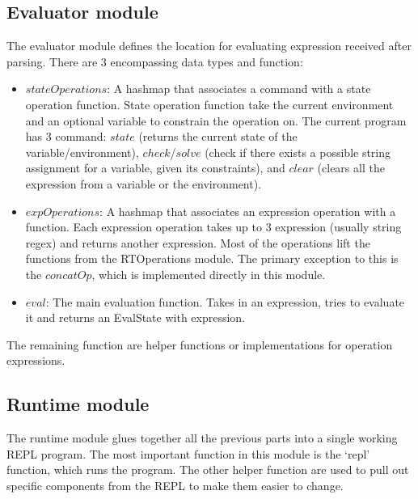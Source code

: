 \documentclass[letterpaper, 11pt]{article}
\begin{document}
\subsection{Evaluator module}\label{code:eval}
The evaluator module defines the location for evaluating expression received after parsing. There are 3 encompassing data types and function:
\begin{itemize}[itemsep=-0.3em]
    \item $stateOperations$: A hashmap that associates a command with a state operation function. State operation function take the current environment and an optional variable to constrain the operation on. The current program has 3 command: $state$ (returns the current state of the variable/environment), $check$/$solve$ (check if there exists a possible string assignment for a variable, given its constraints), and $clear$ (clears all the expression from a variable or the environment). 
    \item $expOperations$: A hashmap that associates an expression operation with a function. Each expression operation takes up to 3 expression (usually string regex) and returns another expression. Most of the operations lift the functions from the RTOperations module. The primary exception to this is the $concatOp$, which is implemented directly in this module.
    \item $eval$: The main evaluation function. Takes in an expression, tries to evaluate it and returns an EvalState with expression. 
\end{itemize}
The remaining function are helper functions or implementations for operation expressions. 

\subsection{Runtime module}\label{code:runtime}
The runtime module glues together all the previous parts into a single working REPL program.
The most important function in this module is the `repl' function, which runs the program.
The other helper function are used to pull out specific components from the REPL to make them easier to change.
\end{document}
